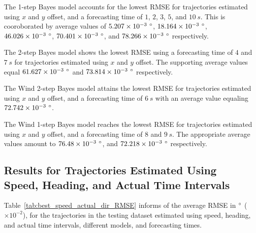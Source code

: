 \documentclass[preprint,12pt]{elsarticle}
\begin{document}
The 1-step Bayes model accounts for the lowest RMSE for trajectories estimated using $x$ and $y$ offset, and a forecasting time of $1$, $2$, $3$, $5$, and $10 \ s$. This is cooroborated by average values of $5.207 \times 10^{-3} \ \degree$, $18.164 \times 10^{-3} \ \degree$, $46.026 \times 10^{-3} \ \degree$, $70.401 \times 10^{-3} \ \degree$, and $78.266 \times 10^{-3} \ \degree$ respectively.

The 2-step Bayes model shows the lowest RMSE using a forecasting time of $4$ and $7 \ s$ for trajectories estimated using $x$ and $y$ offset. The supporting average values equal $61.627 \times 10^{-3} \ \degree$ and $73.814 \times 10^{-3} \ \degree$ respectively.

The Wind 2-step Bayes model attains the lowest RMSE for trajectories estimated using $x$ and $y$ offset, and a forecasting time of $6 \ s$ with an average value equaling $72.742 \times 10^{-3} \ \degree$.

The Wind 1-step Bayes model reaches the lowest RMSE for trajectories estimated using $x$ and $y$ offset, and a forecasting time of $8$ and $9 \ s$. The appropriate average values amount to $76.48 \times 10^{-3} \ \degree$, and $72.218 \times 10^{-3} \ \degree$ respectively.

\subsection{Results for Trajectories Estimated Using Speed, Heading, and Actual Time Intervals}

Table~\ref{tab:best_speed_actual_dir_RMSE} informs of the average RMSE in $\degree$ ($\times 10^{-2}$), for the trajectories in the testing dataset estimated using speed, heading, and actual time intervals, different models, and forecasting times.
\end{document}
